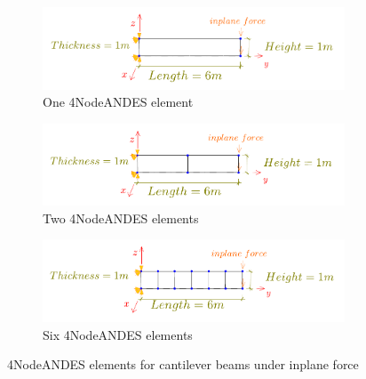 \documentclass[fleqn,11pt,letter]{article}
\begin{document}
\begin{figure}[H]
  \centering
  \begin{subfigure}{0.5\textwidth}
    \centering
    \includegraphics[width=9cm]{../Figure_files/4NodeANDES/beam_ANDES_yz_inPlane_1div.pdf}
    \caption{One 4NodeANDES element}
  \end{subfigure}
  \vskip 8pt
  \begin{subfigure}{0.5\textwidth}
    \centering
    \includegraphics[width=9cm]{../Figure_files/4NodeANDES/beam_ANDES_yz_inPlane_2div.pdf}
    \caption{Two 4NodeANDES elements}
  \end{subfigure}
  \vskip 8pt
  \begin{subfigure}{0.5\textwidth}
    \centering
    \includegraphics[width=9cm]{../Figure_files/4NodeANDES/beam_ANDES_yz_inPlane_6div.pdf}
    \caption{Six 4NodeANDES elements}
  \end{subfigure}
  \captionsetup{justification=centering,margin=3cm}
  \caption{4NodeANDES elements for cantilever beams under inplane force}
  \label{fig 4NodeANDES elements for cantilever beams under inplane force}
\end{figure}




\end{document}
